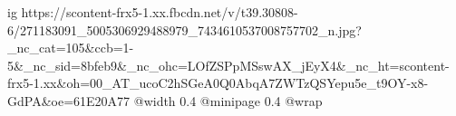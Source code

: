  
 
 
 
 

\ifcmt
  ig https://scontent-frx5-1.xx.fbcdn.net/v/t39.30808-6/271183091_5005306929488979_7434610537008757702_n.jpg?_nc_cat=105&ccb=1-5&_nc_sid=8bfeb9&_nc_ohc=LOfZSPpMSswAX_jEyX4&_nc_ht=scontent-frx5-1.xx&oh=00_AT_ucoC2hSGeA0Q0AbqA7ZWTzQSYepu5e_t9OY-x8-GdPA&oe=61E20A77
  @width 0.4
  @minipage 0.4
  @wrap \parpic[r]
\fi
